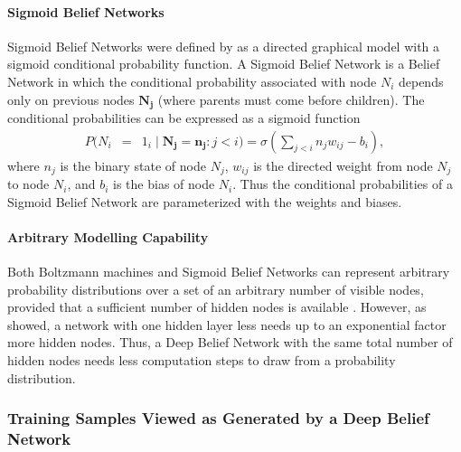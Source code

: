 \paragraph{Sigmoid Belief Networks}

Sigmoid Belief Networks were defined by \cite{Neal1992} as a directed
graphical model with a sigmoid conditional probability function. A
Sigmoid Belief Network is a Belief Network in which the conditional
probability associated with node $N_{i}$ depends only on previous
nodes $\mathbf{N_{j}}$ (where parents must come before children).
The conditional probabilities can be expressed as a sigmoid function
\begin{eqnarray*}
P(N_{i} & = & 1_{i}\mid\mathbf{N_{j}=n_{j}}:j<i)=\sigma(\sum_{j<i}n_{j}w_{ij}-b_{i}),
\end{eqnarray*}
 where $n_{j}$ is the binary state of node $N_{j}$, $w_{ij}$
is the directed weight from node $N_{j}$ to node $N_{i}$, and $b_{i}$
is the bias of node $N_{i}$. Thus the conditional probabilities of
a Sigmoid Belief Network are parameterized with the weights and biases.

\paragraph{Arbitrary Modelling Capability}

Both Boltzmann machines and Sigmoid Belief Networks can represent
arbitrary probability distributions over a set of an arbitrary number
of visible nodes, provided that a sufficient number of hidden nodes
is available \cite{Neal1992}. However, as \cite{Hastad1987} showed,
a network with one hidden layer less needs up to an exponential factor
more hidden nodes. Thus, a Deep Belief Network with the same total
number of hidden nodes needs less computation steps to draw from a
probability distribution.

\subsubsection{Training Samples Viewed as Generated by a Deep Belief Network}

